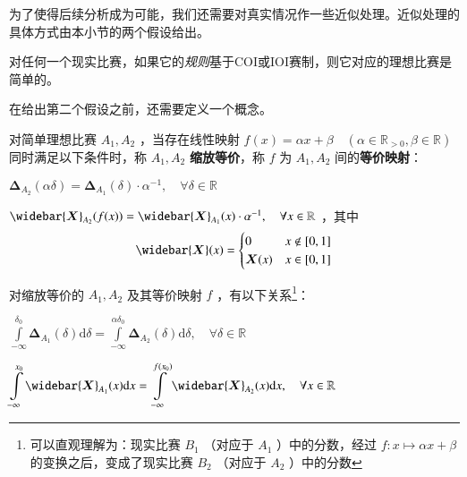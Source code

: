         为了使得后续分析成为可能，我们还需要对真实情况作一些近似处理。近似处理的具体方式由本小节的两个假设给出。

        \begin{assumption}
            对任何一个现实比赛，如果它的\emph{规则}基于COI或IOI赛制，则它对应的理想比赛是简单的。
            \label{ass:simplicityOfCodingContests}
        \end{assumption}

        在给出第二个假设之前，还需要定义一个概念。

        \begin{definition}[缩放等价]
            对简单理想比赛 $A_1,A_2$ ，当存在线性映射 $f(x)=\alpha x+\beta\quad(\alpha\in\mathbb{R}_{> 0},\beta\in\mathbb{R})$ 同时满足以下条件时，称 $A_1,A_2$ \textbf{缩放等价}，称 $f$ 为 $A_1,A_2$ 间的\textbf{等价映射}：
            \begin{asparaenum}
                \item $\bm{\Delta}_{A_2}(\alpha\delta)=\bm{\Delta}_{A_1}(\delta)\cdot \alpha^{-1},\quad\forall \delta\in\mathbb{R}$
                \item $\widebar{\bm{X}}_{A_2}(f(x))=\widebar{\bm{X}}_{A_1}(x)\cdot \alpha^{-1},\quad\forall x\in\mathbb{R}$ ，其中
                    $$
                        \widebar{\bm{X}}(x)=
                        \begin{cases} 
                            0 & x\notin [0,1] \\
                            \bm{X}(x) & x\in[0,1]
                        \end{cases}
                    $$
            \end{asparaenum}

            \label{def:equivalenceAfterScaling}
        \end{definition}

        \begin{proposition}[缩放等价的实际含义]
            对缩放等价的 $A_1,A_2$ 及其等价映射 $f$ ，有以下关系\footnote{可以直观理解为：现实比赛 $B_1$ （对应于 $A_1$ ）中的分数，经过 $f:x\mapsto\alpha x+\beta$ 的变换之后，变成了现实比赛 $B_2$ （对应于 $A_2$ ）中的分数}：
            \begin{asparaenum}
                \item $\displaystyle\int\limits_{-\infty}^{\delta_0} \bm{\Delta}_{A_1}(\delta)\mathrm{d}\delta=\displaystyle\int\limits_{-\infty}^{\alpha\delta_0} \bm{\Delta}_{A_2}(\delta)\mathrm{d}\delta,\quad\forall\delta\in\mathbb{R}$
                \item $\displaystyle\int\limits_{-\infty}^{x_0} \widebar{\bm{X}}_{A_1}(x)\mathrm{d}x=\displaystyle\int\limits_{-\infty}^{f(x_0)} \widebar{\bm{X}}_{A_2}(x)\mathrm{d}x,\quad\forall x\in\mathbb{R}$
            \end{asparaenum}

            \label{prop:equivalenceAfterScalingMeaning}
        \end{proposition}

